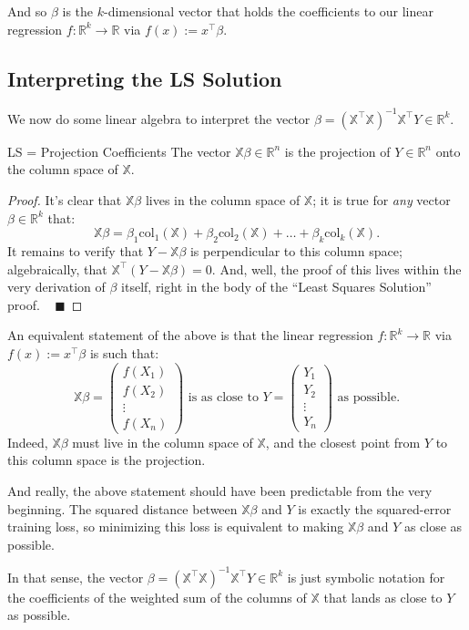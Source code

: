 And so $\beta$ is the $k$-dimensional vector
that holds the coefficients to our linear regression
$f \colon \mathbb{R}^k \to \mathbb{R}$
via $f(x) := x^{\top}\beta$.

\subsection{Interpreting the LS Solution}

We now do some linear algebra to interpret the vector
$\beta = (\mathbb{X}^{\top}\mathbb{X})^{-1}\mathbb{X}^{\top}Y \in \mathbb{R}^k$.

\begin{theorem}{LS = Projection Coefficients}
    The vector $\mathbb{X}\beta \in \mathbb{R}^n$
    is the projection of $Y \in \mathbb{R}^n$
    onto the column space of $\mathbb{X}$.
\end{theorem}

\begin{proof}
    It's clear that $\mathbb{X}\beta$
    lives in the column space of $\mathbb{X}$;
    it is true for \emph{any} vector $\beta \in \mathbb{R}^k$ that:
    \[ \mathbb{X}\beta
    = \beta_1 \mathrm{col}_1(\mathbb{X})
    + \beta_2 \mathrm{col}_2(\mathbb{X})
    + \dots
    + \beta_k \mathrm{col}_k(\mathbb{X}). \]
    It remains to verify that $Y - \mathbb{X}\beta$
    is perpendicular to this column space;
    algebraically, that $\mathbb{X}^{\top}(Y - \mathbb{X}\beta) = 0$.
    And, well, the proof of this
    lives within the very derivation of $\beta$ itself,
    right in the body of the ``Least Squares Solution'' proof.
    ~ $\blacksquare$
\end{proof}

An equivalent statement of the above
is that the linear regression
$f \colon \mathbb{R}^k \to \mathbb{R}$ via $f(x) := x^{\top}\beta$
is such that:
\[
\mathbb{X}\beta =
\begin{pmatrix}
    f(X_1) \\ f(X_2) \\ \vdots \\ f(X_n)
\end{pmatrix}
\text{ is as close to }
Y = \begin{pmatrix} Y_1 \\ Y_2 \\ \vdots \\ Y_n \end{pmatrix}
\text{ as possible.}
\]
Indeed, $\mathbb{X}\beta$ must live in the column space of $\mathbb{X}$,
and the closest point from $Y$ to this column space is the projection.

And really, the above statement
should have been predictable from the very beginning.
The squared distance between $\mathbb{X}\beta$ and $Y$
is exactly the squared-error training loss,
so minimizing this loss is equivalent to
making $\mathbb{X}\beta$ and $Y$ as close as possible.

In that sense, the vector
$\beta = (\mathbb{X}^{\top}\mathbb{X})^{-1}\mathbb{X}^{\top}Y \in \mathbb{R}^k$
is just symbolic notation for the coefficients
of the weighted sum of the columns of $\mathbb{X}$
that lands as close to $Y$ as possible.

